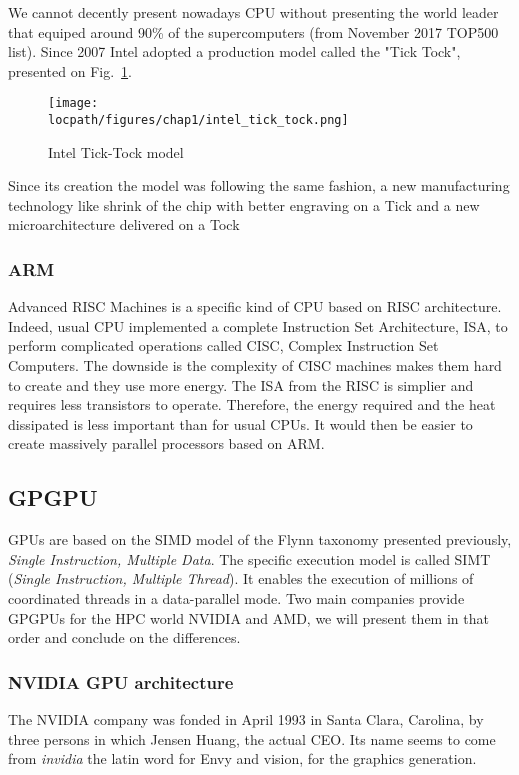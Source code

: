We cannot decently present nowadays CPU without presenting the world leader that equiped around 90\% of the supercomputers (from November 2017 TOP500 list). 
Since 2007 Intel adopted a production model called the "Tick Tock", presented on Fig.~\ref{fig:1_HPC:intel_tick_tock}.

\begin{figure}
\texttt{[image: \\locpath/figures/chap1/intel\_tick\_tock.png]}
\caption{Intel Tick-Tock model}
\label{fig:1_HPC:intel_tick_tock}
\end{figure}

Since its creation the model was following the same fashion, a new manufacturing technology like shrink of the chip with better engraving on a Tick and a new microarchitecture delivered on a Tock

\subsubsection{ARM}
Advanced RISC Machines is a specific kind of CPU based on RISC architecture. 
Indeed, usual CPU implemented a complete Instruction Set Architecture, ISA, to perform complicated operations called CISC, Complex Instruction Set Computers. 
The downside is the complexity of CISC machines makes them hard to create and they use more energy. 
The ISA from the RISC is simplier and requires less transistors to operate. 
Therefore, the energy required and the heat dissipated is less important than for usual CPUs. 
It would then be easier to create massively parallel processors based on ARM. 

\subsection{GPGPU}

GPUs are based on the SIMD model of the Flynn taxonomy presented previously, \emph{Single Instruction, Multiple Data}.
The specific execution model is called SIMT (\emph{Single Instruction, Multiple Thread}). It enables the execution of millions of coordinated threads in a data-parallel mode. 
Two main companies provide GPGPUs for the HPC world NVIDIA and AMD, we will present them in that order and conclude on the differences. 

\subsubsection{NVIDIA GPU architecture}

The NVIDIA company was fonded in April 1993 in Santa Clara, Carolina, by three persons in which Jensen Huang, the actual CEO.
Its name seems to come from \textit{invidia} the latin word for Envy and vision, for the graphics generation. 


